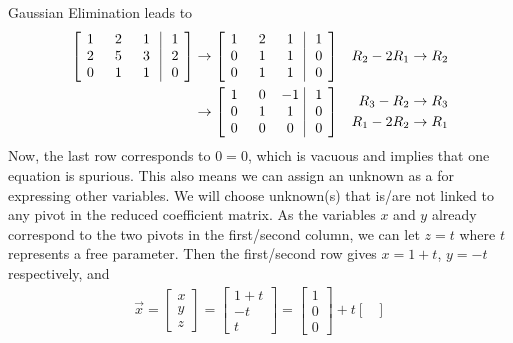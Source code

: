 \begin{solution} 
Gaussian Elimination leads to
\begin{align*}
\left[\begin{array}{@{\,}wc{10pt}wc{10pt}wc{10pt}|wc{10pt}@{\,}}
1 & 2 & 1 & 1 \\
2 & 5 & 3 & 2 \\
0 & 1 & 1 & 0
\end{array}\right] 
& \to 
\left[\begin{array}{@{\,}wc{10pt}wc{10pt}wc{10pt}|wc{10pt}@{\,}}
1 & 2 & 1 & 1 \\
0 & 1 & 1 & 0 \\
0 & 1 & 1 & 0
\end{array}\right] 
& R_2 - 2R_1 \to R_2 \\
& \to 
\left[\begin{array}{@{\,}wc{10pt}wc{10pt}wc{10pt}|wc{10pt}@{\,}}
1 & 0 & -1 & 1 \\
0 & 1 & 1 & 0 \\
0 & 0 & 0 & 0
\end{array}\right] 
& \begin{aligned}
R_3-R_2 &\to R_3 \\
R_1-2R_2 &\to R_1    
\end{aligned}
\end{align*}
Now, the last row corresponds to $0 = 0$, which is vacuous and implies that one equation is spurious. This also means we can assign an unknown as a  for expressing other variables. We will choose unknown(s) that is/are not linked to any pivot in the reduced coefficient matrix. As the variables $x$ and $y$ already correspond to the two pivots in the first/second column, we can let $z = t$ where $t$ represents a free parameter. Then the first/second row gives $x = 1+t$, $y = -t$ respectively, and
\begin{align*}
\vec{x} = 
\begin{bmatrix}
x \\
y \\
z
\end{bmatrix}
=
\begin{bmatrix}
1+t \\
-t \\
t
\end{bmatrix}
=
\begin{bmatrix}
1 \\
0 \\
0
\end{bmatrix}
+ t
\begin{bmatrix}

\end{bmatrix}
\end{align*}
\end{solution}
